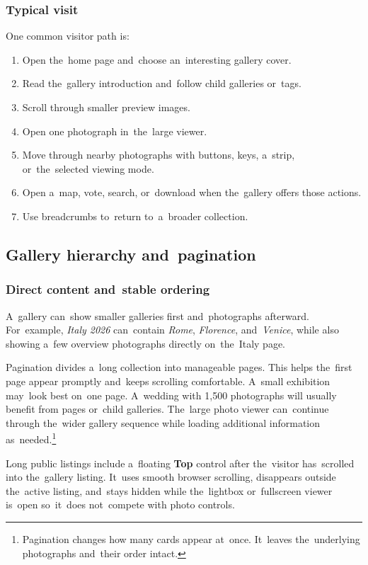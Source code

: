 \documentclass[11pt,a4paper]{article}
\newcommand{\ui}[1]{\textbf{#1}}
\begin{document}
\subsubsection{Typical visit}

One common visitor path is:

\begin{enumerate}
  \item Open the~home page and~choose an~interesting gallery cover.
  \item Read the~gallery introduction and~follow child galleries or~tags.
  \item Scroll through smaller preview images.
  \item Open one photograph in~the~large viewer.
  \item Move through nearby photographs with buttons, keys, a~strip,
  or~the~selected viewing mode.
  \item Open a~map, vote, search, or~download when the~gallery offers those
  actions.
  \item Use breadcrumbs to~return to~a~broader collection.
\end{enumerate}

\subsection{Gallery hierarchy and~pagination}

\subsubsection{Direct content and~stable ordering}

A~gallery can~show smaller galleries first and~photographs afterward.
For~example, \emph{Italy 2026} can~contain \emph{Rome}, \emph{Florence},
and~\emph{Venice}, while also showing a~few overview photographs directly
on~the~Italy page.

Pagination divides a~long collection into manageable pages. This helps the~first
page appear promptly and~keeps scrolling comfortable. A~small exhibition
may~look best on~one page. A~wedding with 1,500 photographs will usually benefit
from pages or~child galleries. The~large photo viewer can~continue through
the~wider gallery sequence while loading additional information
as~needed.\footnote{Pagination changes how many cards appear at~once. It~leaves
the~underlying photographs and~their order intact.}

Long public listings include a~floating \ui{Top} control after the~visitor
has~scrolled into the~gallery listing. It~uses smooth browser scrolling,
disappears outside the~active listing, and~stays hidden while the~lightbox
or~fullscreen viewer is~open so~it~does not~compete with photo controls.
\end{document}
